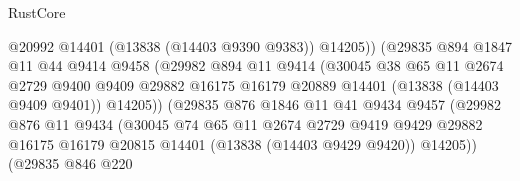 \begin{lexlean}{RustCore}
\begin{coremodule}
                                    @20992
                                    @14401
                                    (@13838 (@14403 @9390 @9383))
                                    @14205))
                                (@29835
                                  @894
                                  @1847
                                  @11
                                  @44
                                  @9414
                                  @9458
                                  (@29982
                                    @894
                                    @11
                                    @9414
                                    (@30045
                                      @38
                                      @65
                                      @11
                                      @2674
                                      @2729
                                      @9400
                                      @9409
                                      @29882
                                      @16175
                                      @16179
                                      @20889
                                      @14401
                                      (@13838 (@14403 @9409 @9401))
                                      @14205))
                                  (@29835
                                    @876
                                    @1846
                                    @11
                                    @41
                                    @9434
                                    @9457
                                    (@29982
                                      @876
                                      @11
                                      @9434
                                      (@30045
                                        @74
                                        @65
                                        @11
                                        @2674
                                        @2729
                                        @9419
                                        @9429
                                        @29882
                                        @16175
                                        @16179
                                        @20815
                                        @14401
                                        (@13838 (@14403 @9429 @9420))
                                        @14205))
                                    (@29835
                                      @846
                                      @220

\end{coremodule}
\end{lexlean}
